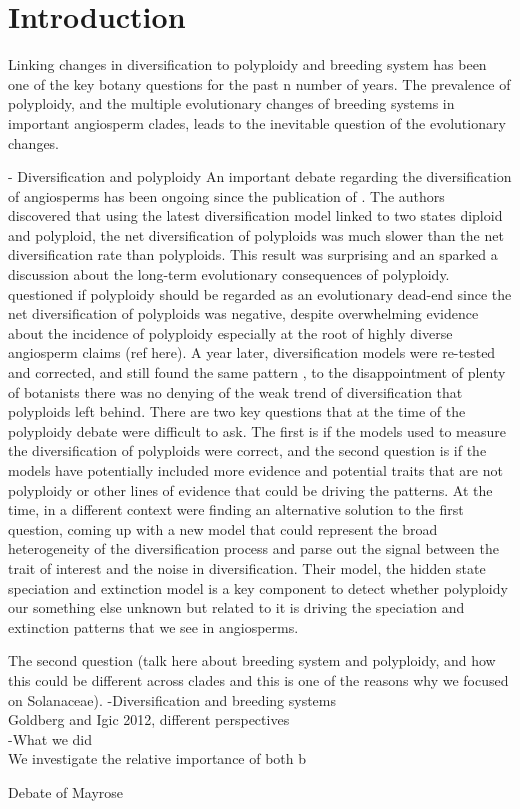 \section{Introduction}
Linking changes in diversification to polyploidy and breeding system has been one of the key botany questions for the past n number of years. The prevalence of polyploidy, and the multiple evolutionary changes of breeding systems in important angiosperm clades, leads to the inevitable question of the evolutionary changes.

- Diversification and polyploidy\newline
An important debate regarding the diversification of angiosperms has been ongoing since the publication of \citet{mayrose_2011}. The authors discovered that using the latest diversification model linked to two states diploid and polyploid, the net diversification of polyploids was much slower than the net diversification rate than polyploids. This result was surprising and an sparked a discussion about the long-term evolutionary consequences of polyploidy. \citet{soltis_2014} questioned if polyploidy should be regarded as an evolutionary dead-end since the net diversification of polyploids was negative, despite overwhelming evidence about the incidence of polyploidy  especially at the root of highly diverse angiosperm claims (ref here). A year later, diversification models were re-tested and corrected, and still found the same pattern \citep{mayrose_2015}, to the disappointment of plenty of botanists there was no denying of the weak trend of diversification that polyploids left behind. \newline
There are two key questions that at the time of the polyploidy debate were difficult to ask. The first is if the models used to measure the diversification of polyploids were correct, and the second question is if the models have potentially included more evidence and potential traits that are not polyploidy or other lines of evidence that could be driving the patterns. At the time, in a different context \citet{beaulieu_2016} were finding an alternative solution to the first question, coming up with a new model that could represent the broad heterogeneity of the diversification process and parse out the signal between the trait of interest and the noise in diversification. Their model, the hidden state speciation and extinction model is a key component to detect whether polyploidy our something else unknown but related to it is driving the speciation and extinction patterns that we see in angiosperms. \newline

The second question (talk here about breeding system and polyploidy, and how this could be different across clades and this is one of the reasons why we focused on Solanaceae).
-Diversification and breeding systems\\
Goldberg and Igic 2012, different  perspectives\\

-What we did\\
We investigate the relative importance of both b



Debate of Mayrose